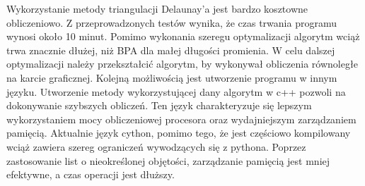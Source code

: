 Wykorzystanie metody triangulacji Delaunay'a jest bardzo kosztowne obliczeniowo. Z przeprowadzonych testów wynika, że czas trwania programu wynosi około 10 minut. Pomimo wykonania szeregu optymalizacji algorytm wciąż trwa znacznie dłużej, niż BPA dla małej długości promienia. W celu dalszej optymalizacji należy przekształcić algorytm, by wykonywał obliczenia równoległe na karcie graficznej. Kolejną możliwością jest utworzenie programu w innym języku. Utworzenie metody wykorzystującej dany algorytm w c++ pozwoli na dokonywanie szybszych obliczeń. Ten język charakteryzuje się lepszym wykorzystaniem mocy obliczeniowej procesora oraz wydajniejszym zarządzaniem pamięcią. Aktualnie język cython, pomimo tego, że jest częściowo kompilowany wciąż zawiera szereg ograniczeń wywodzących się z pythona. Poprzez zastosowanie list o nieokreślonej objętości, zarządzanie pamięcią jest mniej efektywne, a czas operacji jest dłuższy. 


